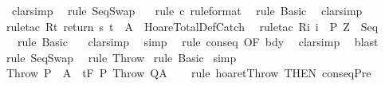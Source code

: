 \begin{isabellebody}
\isamarkupfalse%
\ \ {\isacharparenleft}clarsimp{\isacharparenright}\isanewline
{}\isamarkupfalse%
\ \ {\isacharparenleft}rule\ SeqSwap{\isacharparenright}\isanewline
{}\isamarkupfalse%
\ \ \ {\isacharparenleft}rule\ c\ {\isacharbrackleft}rule{\isacharunderscore}format{\isacharbrackright}{\isacharparenright}\isanewline
{}\isamarkupfalse%
\ \ {\isacharparenleft}rule\ Basic{\isacharparenright}\isanewline
{}\isamarkupfalse%
\ \ clarsimp\isanewline
{}\isamarkupfalse%
\ {\isacharparenleft}rule{\isacharunderscore}tac\ R{\isacharequal}{\isachardoublequoteopen}{\isacharbraceleft}t{\isachardot}\ return\ s\ t\ {\isasymin}\ A{\isacharbraceright}{\isachardoublequoteclose}\ \ HoareTotalDef{\isachardot}Catch{\isacharparenright}\isanewline
{}\isamarkupfalse%
\ \ {\isacharparenleft}rule{\isacharunderscore}tac\ R{\isacharequal}{\isachardoublequoteopen}{\isacharbraceleft}i{\isachardot}\ i\ {\isasymin}\ P{\isacharprime}\ Z{\isacharbraceright}{\isachardoublequoteclose}\ \ Seq{\isacharparenright}\isanewline
{}\isamarkupfalse%
\ \ \ {\isacharparenleft}rule\ Basic{\isacharparenright}\isanewline
{}\isamarkupfalse%
\ \ \ clarsimp\isanewline
{}\isamarkupfalse%
\ \ simp\isanewline
{}\isamarkupfalse%
\ \ {\isacharparenleft}rule\ conseq\ {\isacharbrackleft}OF\ bdy{\isacharbrackright}{\isacharparenright}\isanewline
{}\isamarkupfalse%
\ \ clarsimp\isanewline
{}\isamarkupfalse%
\ \ blast\isanewline
{}\isamarkupfalse%
\ {\isacharparenleft}rule\ SeqSwap{\isacharparenright}\isanewline
{}\isamarkupfalse%
\ \ {\isacharparenleft}rule\ Throw{\isacharparenright}\isanewline
{}\isamarkupfalse%
\ {\isacharparenleft}rule\ Basic{\isacharparenright}\isanewline
{}\isamarkupfalse%
\ simp\isanewline
{}\isamarkupfalse%
%
\endisatagproof
{\isafoldproof}%
%
\isadelimproof
\isanewline
%
\endisadelimproof
\isanewline
\isanewline
{}\isamarkupfalse%
\ Throw{\isacharcolon}\ {\isachardoublequoteopen}P\ {\isasymsubseteq}\ A\ {\isasymLongrightarrow}\ {\isasymGamma}{\isacharcomma}{\isasymTheta}{\isasymturnstile}\isactrlsub t\isactrlbsub {\isacharslash}F\isactrlesub \ P\ Throw\ Q{\isacharcomma}A{\isachardoublequoteclose}\isanewline
%
\isadelimproof
\ \ %
\endisadelimproof
%
\isatagproof
{}\isamarkupfalse%
\ {\isacharparenleft}rule\ hoaret{\isachardot}Throw\ {\isacharbrackleft}THEN\ conseqPre{\isacharbrackright}{\isacharparenright}%

\end{isabellebody}
